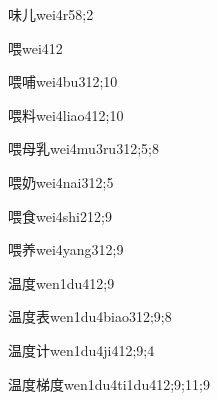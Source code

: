 \begin{verbete}{味儿}{wei4r5}{8;2}
\end{verbete}

\begin{verbete}{喂}{wei4}{12}
\end{verbete}

\begin{verbete}{喂哺}{wei4bu3}{12;10}
\end{verbete}

\begin{verbete}{喂料}{wei4liao4}{12;10}
\end{verbete}

\begin{verbete}{喂母乳}{wei4mu3ru3}{12;5;8}
\end{verbete}

\begin{verbete}{喂奶}{wei4nai3}{12;5}
\end{verbete}

\begin{verbete}{喂食}{wei4shi2}{12;9}
\end{verbete}

\begin{verbete}{喂养}{wei4yang3}{12;9}
\end{verbete}

\begin{verbete}{温度}{wen1du4}{12;9}
\end{verbete}

\begin{verbete}{温度表}{wen1du4biao3}{12;9;8}
\end{verbete}

\begin{verbete}{温度计}{wen1du4ji4}{12;9;4}
\end{verbete}

\begin{verbete}{温度梯度}{wen1du4ti1du4}{12;9;11;9}
\end{verbete}

